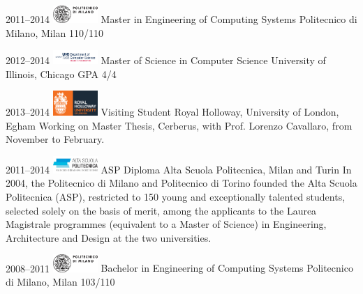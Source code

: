 \documentclass[]{friggeri-cv} %
\newcommand{\breath}{\newline\vspace*{-.35cm}\newline}
\begin{document}
\begin{entrylist}
\entry
{2011--2014\breath
\includegraphics[width=1.7cm]{img/logo_polimi.eps}}
{Master {\normalfont in Engineering of Computing Systems}}
{Politecnico di Milano, Milan}
{110/110}
\rule{0pt}{3ex}
\entry
{2012--2014\breath
\includegraphics[width=1.7cm]{img/logo_uic.pdf}}
{Master of Science {\normalfont in Computer Science}}
{University of Illinois, Chicago}
{GPA 4/4}
\rule{0pt}{3ex}
\entry
{2013--2014\breath
\includegraphics[width=1.7cm]{img/logo_rhul.eps}}
{Visiting Student}
{Royal Holloway, University of London, Egham}
{Working on Master Thesis, Cerberus, with Prof. Lorenzo Cavallaro, from November to February.}
\rule{0pt}{3ex}
\entry
{2011--2014\breath
\includegraphics[width=1.7cm]{img/logo_asp.jpg}}
{ASP Diploma}
{Alta Scuola Politecnica, Milan and Turin}
{In 2004, the Politecnico di Milano and Politecnico di Torino founded the Alta Scuola Politecnica (ASP), restricted to 150 young and exceptionally talented students, selected solely on the basis of merit, among the applicants to the Laurea Magistrale programmes (equivalent to a Master of Science) in Engineering, Architecture and Design at the two universities.}
\rule{0pt}{3ex}
\entry
{2008--2011\breath
\includegraphics[width=1.7cm]{img/logo_polimi.eps}}
{Bachelor {\normalfont in Engineering of Computing Systems}}
{Politecnico di Milano, Milan}
{103/110}
\end{entrylist}

\end{document}

